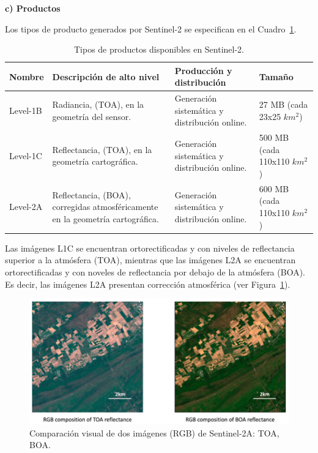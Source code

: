 \textbf{c) Productos}

Los tipos de producto generados por Sentinel-2 se especifican en el Cuadro~\ref{tab:SentinelTipoProducto}.

\begin{table}[H]
    \caption{Tipos de productos disponibles en Sentinel-2.}
    \small
    \begin{tabularx}{1\textwidth}{XXXX}
        \hline
        \textbf{Nombre} & \textbf{Descripción de alto nivel}                                             & \textbf{Producción y distribución}            & \textbf{Tamaño}                \\ \hline
        Level-1B        & Radiancia, (TOA), en la geometría del sensor.                                  & Generación sistemática y distribución online. & 27 MB (cada 23x25 $km^{2}$)    \\
        Level-1C        & Reflectancia, (TOA), en la geometría cartográfica.                             & Generación sistemática y distribución online. & 500 MB (cada 110x110 $km^{2}$) \\
        Level-2A        & Reflectancia, (BOA), corregidas atmosféricamente en la geometría cartográfica. & Generación sistemática y distribución online. & 600 MB (cada 110x110 $km^{2}$) \\ \hline
    \end{tabularx}
    \begin{minipage}{\textwidth}
        \vspace{10pt}
        \label{tab:SentinelTipoProducto}
    \end{minipage}
\end{table}

Las imágenes L1C se encuentran ortorectificadas y con niveles de reflectancia superior a la atmósfera (TOA), mientras que las imágenes L2A se encuentran ortorectificadas y con noveles de reflectancia por debajo de la atmósfera (BOA). Es decir, las imágenes L2A presentan corrección atmosférica (ver Figura~\ref{fig:ComparacionBOATOA}).

\begin{figure}[H]
    \begin{center}
        \includegraphics[width=1\textwidth]{Images/ComparacionBOATOA.png}
    \end{center}
    \caption{Comparación visual de dos imágenes (RGB) de Sentinel-2A: TOA, BOA.}
    \label{fig:ComparacionBOATOA}
\end{figure}

